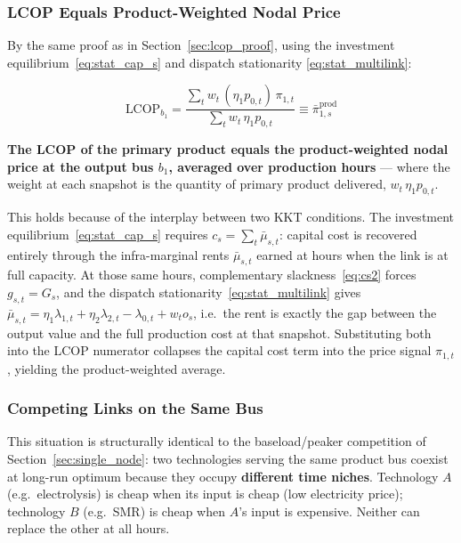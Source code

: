 \documentclass{article}
\begin{document}
\subsubsection{LCOP Equals Product-Weighted Nodal Price}

By the same proof as in Section~\ref{sec:lcop_proof}, using the
investment equilibrium~\eqref{eq:stat_cap_s} and dispatch stationarity
\eqref{eq:stat_multilink}:

\begin{equation}
    \text{LCOP}_{b_1}
    = \frac{\displaystyle\sum_t w_t\, (\eta_1 p_{0,t})\, \pi_{1,t}}
           {\displaystyle\sum_t w_t\, \eta_1 p_{0,t}}
    \equiv \bar{\pi}^{\text{prod}}_{1,s}
    \label{eq:lcop_prod_weighted}
\end{equation}

\textbf{The LCOP of the primary product equals the product-weighted nodal price
at the output bus $b_1$, averaged over production hours} --- where the weight
at each snapshot is the quantity of primary product delivered,
$w_t\,\eta_1 p_{0,t}$.

This holds because of the interplay between two KKT conditions.
The investment equilibrium~\eqref{eq:stat_cap_s} requires
$c_s = \sum_t \bar{\mu}_{s,t}$: capital cost is recovered entirely through
the infra-marginal rents $\bar{\mu}_{s,t}$ earned at hours when the link is
at full capacity.
At those same hours, complementary slackness~\eqref{eq:cs2} forces
$g_{s,t} = G_s$, and the dispatch stationarity~\eqref{eq:stat_multilink}
gives $\bar{\mu}_{s,t} = \eta_1\lambda_{1,t} + \eta_2\lambda_{2,t}
- \lambda_{0,t} + w_t o_s$, i.e.\ the rent is exactly the gap between the
output value and the full production cost at that snapshot.
Substituting both into the LCOP numerator collapses the capital cost term
into the price signal $\pi_{1,t}$, yielding the product-weighted average.

\subsubsection{Competing Links on the Same Bus}

This situation is structurally identical to the baseload/peaker competition
of Section~\ref{sec:single_node}: two technologies serving the same product
bus coexist at long-run optimum because they occupy \textbf{different time
niches}. Technology $A$ (e.g.\ electrolysis) is cheap when its input is
cheap (low electricity price); technology $B$ (e.g.\ SMR) is cheap when
$A$'s input is expensive. Neither can replace the other at all hours.
\end{document}
